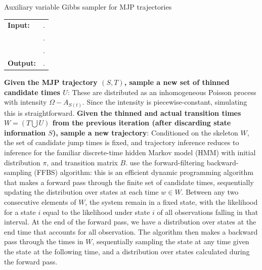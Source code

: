 \begin{algorithm}[H]
  \caption{Auxiliary variable Gibbs sampler for MJP trajectories~\cite{RaoTeh13} }
   \label{alg:Unif_gibbs}
  \begin{tabular}{l l}
   \textbf{Input:  } & \text{MJP parameters $\theta$; a set of partial and noisy observations $X$}. \\
                     & \text{A  parameter $\Omega > \max_i A_s$}.\\
                      & \text{The previous MJP path $S(t) = (S, T)$}.\\ 
   \textbf{Output:  }& \text{A new MJP trajectory $\tilde{S} (t) = (\tilde{S}, \tilde{T})$}.\\
   \hline
   \end{tabular}
   \begin{algorithmic}[1]
\State \textbf{Given the MJP trajectory $(S,T)$, sample a new set of thinned 
candidate times $U$}: %
These are distributed as an inhomogeneous Poisson process with intensity 
$\Omega-A_{S(t)}$. Since the intensity is piecewise-constant, simulating this 
is straightforward.
\State \textbf{Given the thinned and actual transition times $W = (T \bigcup U)$
from the previous iteration (after discarding state information $S$), 
sample a new trajectory}:
    Conditioned on the skeleton $W$, the set of candidate jump
    times is fixed, and trajectory inference reduces to inference for
    the familiar discrete-time hidden Markov model (HMM) with initial distribution
    $\pi$, and transition matrix $B$. \cite{RaoTeh13} use the forward-filtering
    backward-sampling (FFBS) algorithm: this is an efficient dynamic 
    programming algorithm that makes a forward pass through the
    finite set of candidate times, sequentially updating the 
    distribution over states at each time $w \in W$. 
    Between any two consecutive elements of $W$,
    the system remain in a fixed state, with the likelihood for a state $i$ equal
    to the likelihood under state $i$ of all observations 
    falling in that interval. 
    At the end of the forward pass, we have a distribution over states at the
    end time that accounts for all observation.
    The algorithm then makes a backward pass through the times in $W$, 
    sequentially sampling the state at any time given the state at the 
    following time, and a distribution over states calculated during the
    forward pass. 
\end{algorithmic}
\end{algorithm}

